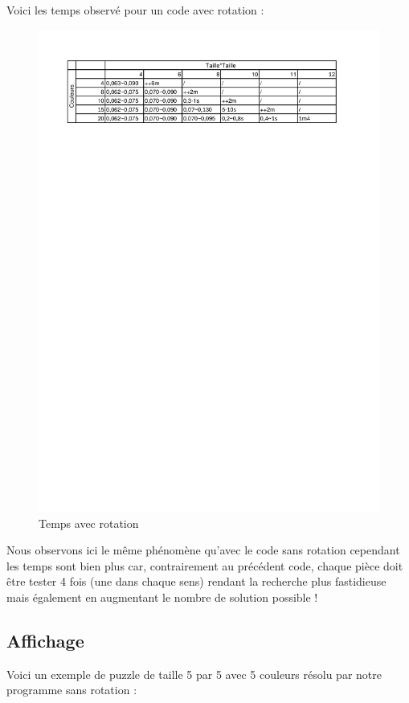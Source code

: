 \documentclass[12pt, openany]{report}
\begin{document}
Voici les temps observé pour un code avec rotation :
\begin{figure}
  \includegraphics[width=\linewidth]{img/TimeR.png}
  \caption{Temps avec rotation}
  \label{img:timeR}
\end{figure}
Nous observons ici le même phénomène qu'avec le code sans rotation cependant les temps sont bien plus car, contrairement au précédent code, chaque pièce doit être tester 4 fois (une dans chaque sens) rendant la recherche plus fastidieuse mais également en augmentant le nombre de solution possible ! 

\subsection*{Affichage}

Voici un exemple de puzzle de taille 5 par 5 avec 5 couleurs résolu
par notre programme sans rotation :
\begin{verbnobox}\fontsize{7pt}{7pt}\selectfont
\end{verbnobox}
\end{document}
